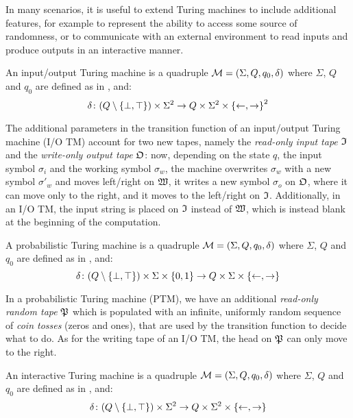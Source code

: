 In many scenarios, it is useful to extend Turing machines to include additional features, for 
example to represent the ability to access some source of randomness, or to communicate with an 
external environment to read inputs and produce outputs in an interactive manner.
\begin{definition}
  An input/output Turing machine is a quadruple \(\mathcal{M} = \Tuple{\Sigma, Q, q_0, \delta}\)
  where \(\Sigma \), \(Q\) and \(q_0\) are defined as in , and:
  \[
    \delta\colon {\Parens*{Q \setminus \Set{\bot, \top}} \times \Sigma^2} \to 
    {Q \times \Sigma^2 \times \Set{\leftarrow, \rightarrow}^2}
  \]  
\end{definition}

The additional parameters in the transition function of an input/output Turing machine (I/O TM) 
account for two new tapes, namely the \emph{read-only input tape} \(\Tapein \) and the 
\emph{write-only output tape} \(\Tapeout \): now, depending on the state \(q\), the input symbol 
\(\sigma_{i}\) and the working symbol \(\sigma_{w}\), the machine overwrites \(\sigma_{w}\) with a 
new symbol \(\sigma'_{w}\) and moves left/right on \(\Tapework \), it writes a new symbol 
\(\sigma_{o}\) on \(\Tapeout \), where it can move only to the right, and it moves to the 
left/right on \(\Tapein \).
Additionally, in an I/O TM, the input string is placed on \(\Tapein \) instead of \(\Tapework \), 
which is instead blank at the beginning of the computation.
\begin{definition}
  A probabilistic Turing machine is a quadruple \(\mathcal{M} = \Tuple{\Sigma, Q, q_0, \delta}\)
  where \(\Sigma \), \(Q\) and \(q_0\) are defined as in , and:
  \[
    \delta\colon {\Parens*{Q \setminus \Set{\bot, \top}} \times \Sigma \times \Set{0, 1}} \to 
    {Q \times \Sigma \times \Set{\leftarrow, \rightarrow}}
  \]    
\end{definition}

In a probabilistic Turing machine (PTM), we have an additional \emph{read-only random tape} 
\(\Taperand \) which is populated with an infinite, uniformly random sequence of \emph{coin tosses} 
(zeros and ones), that are used by the transition function to decide what to do.
As for the writing tape of an I/O TM, the head on \(\Taperand \) can only move to the right.
\begin{definition}
  An interactive Turing machine is a quadruple \(\mathcal{M} = \Tuple{\Sigma, Q, q_0, \delta}\)
  where \(\Sigma \), \(Q\) and \(q_0\) are defined as in , and:
  \[
    \delta\colon {\Parens*{Q \setminus \Set{\bot, \top}} \times \Sigma^2} \to
    {Q \times \Sigma^2 \times \Set{\leftarrow, \rightarrow}}
  \]
\end{definition}

